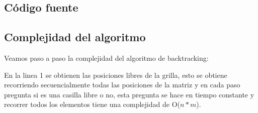 \subsection{Código fuente}

\subsection{Complejidad del algoritmo}

Veamos paso a paso la complejidad del algoritmo de backtracking:

En la linea 1 se obtienen las posiciones libres de la grilla, esto se obtiene recorriendo secuencialmente todas las posiciones de la matriz y en cada paso pregunta si es una casilla libre o no, esta pregunta se hace en tiempo constante y recorrer todos los elementos tiene una complejidad de O($n*m$).



